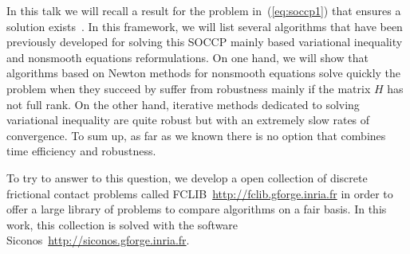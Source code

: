 \documentclass[10pt,a4paper]{article}
\begin{document}
In this talk we will recall a result for the problem in~(\ref{eq:soccp1}) that ensures a solution exists~\cite{ZAMM:ZAMM201000073}. In this framework, we will list several algorithms that have been previously developed for solving this SOCCP mainly based variational inequality and nonsmooth equations reformulations. On one hand, we will show that algorithms based on Newton methods for nonsmooth equations solve quickly the problem when they succeed by suffer from robustness mainly if the matrix $H$ has not full rank. On the other hand, iterative methods dedicated to solving variational inequality are quite robust but with an extremely slow rates of convergence. To sum up, as far as we known there is no option that combines time efficiency and robustness.

To try to answer to this question, we develop a open collection of discrete frictional contact problems called FCLIB~\url{http://fclib.gforge.inria.fr} in order to offer a large library of problems to compare algorithms on a fair basis.  In this work, this collection is solved with the software {\sc Siconos}~\url{http://siconos.gforge.inria.fr}.
\small


\end{document}
